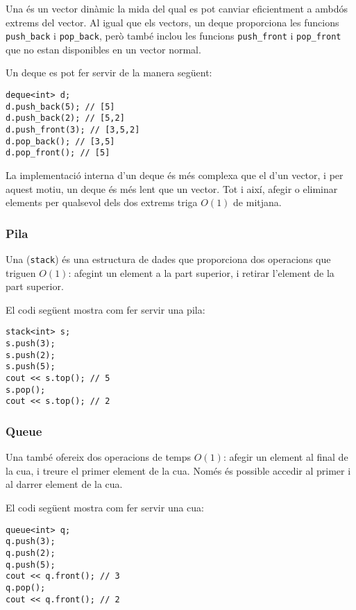
Una  és un vector dinàmic
la mida del qual es pot canviar eficientment
a ambdós extrems del vector.
Al igual que els vectors, un deque proporciona les funcions
\texttt{push\_back} i \texttt{pop\_back}, però
també inclou les funcions
\texttt{push\_front} i \texttt{pop\_front}
que no estan disponibles en un vector normal.

Un deque es pot fer servir de la manera següent:
\begin{lstlisting}
deque<int> d;
d.push_back(5); // [5]
d.push_back(2); // [5,2]
d.push_front(3); // [3,5,2]
d.pop_back(); // [3,5]
d.pop_front(); // [5]
\end{lstlisting}

La implementació interna d'un deque
és més complexa que el d'un vector,
i per aquest motiu, un deque és més lent que un vector.
Tot i així, afegir o eliminar
elements per qualsevol dels dos extrems triga $O(1)$ de mitjana.

\subsubsection{Pila}


Una  (\texttt{stack})
és una estructura de dades que proporciona dos
operacions que triguen $O(1)$:
afegint un element a la part superior,
i retirar l'element de la part superior.

El codi següent mostra com fer servir una pila:
\begin{lstlisting}
stack<int> s;
s.push(3);
s.push(2);
s.push(5);
cout << s.top(); // 5
s.pop();
cout << s.top(); // 2
\end{lstlisting}

\subsubsection{Queue}


Una  també
ofereix dos operacions de temps $O(1)$:
afegir un element al final de la cua,
i treure el primer element de la cua.
Només és possible accedir al primer i al darrer element de la cua.

El codi següent mostra com fer servir una cua:
\begin{lstlisting}
queue<int> q;
q.push(3);
q.push(2);
q.push(5);
cout << q.front(); // 3
q.pop();
cout << q.front(); // 2
\end{lstlisting}

